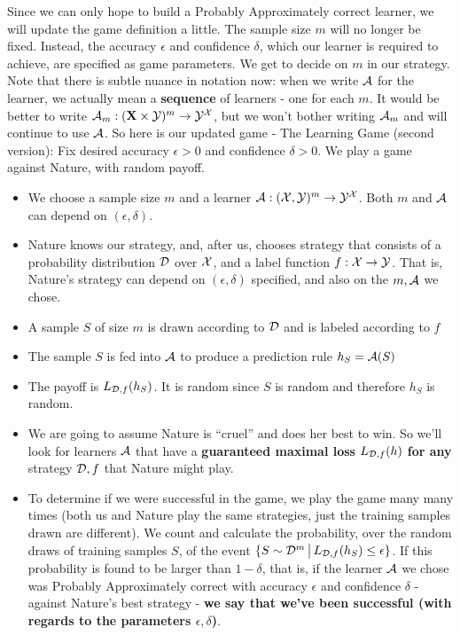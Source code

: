 {Since we can only hope to build a Probably Approximately correct learner, we
will update the game definition a little. The sample size $m$ will no longer be
fixed. Instead, the accuracy $\epsilon$ and confidence $\delta$,  which our
learner is required to achieve, are specified as game parameters. We get to
decide on $m$ in our strategy. Note that there is subtle nuance in notation now:
when we write $\mathcal{A}$ for the learner, we actually mean a {\bf sequence} of
learners - one for each $m$. It would be better to write $\mathcal{A}_m:(\mathbf{X}\times \mathcal{Y})^m
\to \mathcal{Y} ^{\mathcal{X}}$, but we won't bother writing $\mathcal{A}_m$ and will continue to use $\mathcal{A}$.
\vspace{3mm}
So here is our updated game - The Learning Game (second version): Fix desired accuracy $\epsilon>0$ and confidence $\delta>0$. We play a game against Nature, with random payoff.
\begin{itemize}
	\item We choose a sample size $m$ and a learner $\mathcal{A}:(\mathcal{X},\mathcal{Y})^m \to \mathcal{Y} ^{\mathcal{X}}$. 
	Both $m$ and $\mathcal{A}$ can depend on $(\epsilon,\delta)$.
	\item Nature knows our strategy, and, after us, chooses strategy that consists of a probability distribution $\mathcal{D}$ over $\mathcal{X}$, and a label function $f:\mathcal{X}\to\mathcal{Y}$. 
	That is, Nature's strategy can depend on $(\epsilon,\delta)$ specified, and also on the $m,\mathcal{A}$ we chose. 
	\item A sample $S$ of size $m$ is drawn according to $\mathcal{D}$ and is labeled
	according to $f$
	\item The sample $S$ is fed into $\mathcal{A}$ to produce a prediction rule
	$h_S=\mathcal{A}(S)$
	\item The payoff is $L_{\mathcal{D},f}(h_S)$. It is random since $S$ is random and
	therefore $h_S$ is random.
	\item We are going to assume Nature is ``cruel'' and does her best to win.
	So we'll look for learners $\mathcal{A}$ that have a {\bf guaranteed maximal 
		loss} $L_{\mathcal{D},f}(h)$ {\bf for any} strategy $\mathcal{D},f$ that Nature might play.
	\item To determine if we were successful in the game, we play the game many many times 
	(both us and Nature play the same strategies, just the training samples drawn are different).
	We count and calculate the probability, over the random draws of training samples $S$, of the event
	$\{ S \sim \mathcal{D} ^m \,\big |\,L_{\mathcal{D},f}(h_S)\leq \epsilon \}$. If this probability is found to be 
	larger than $1-\delta$, that is, if 
	the learner $\mathcal{A}$ we chose was Probably Approximately correct with accuracy $\epsilon$ and confidence $\delta$ - against Nature's best strategy - {\bf we say that we've been successful (with regards to the parameters $\epsilon,\delta$)}.
\end{itemize}


}
